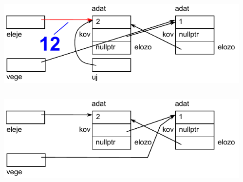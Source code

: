 \begin{frame}
  \begin{columns}[c]
      \scriptsize
      \begin{exampleblock}{}
        \vspace{-.2cm}
        
        \vspace{-.2cm}
      \end{exampleblock}
      \includegraphics[width=\textwidth]{sor/sor13.pdf}
  \end{columns}
\end{frame}

\begin{frame}
  \begin{columns}[c]
      \scriptsize
      \begin{exampleblock}{}
        \vspace{-.2cm}
        
        \vspace{-.2cm}
      \end{exampleblock}
      \includegraphics[width=\textwidth]{sor/sor14.pdf}
  \end{columns}
\end{frame}